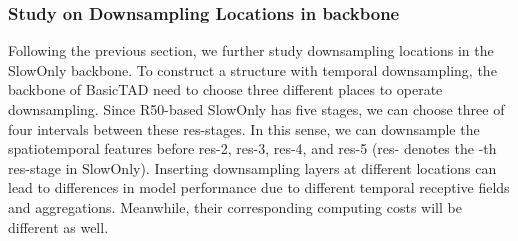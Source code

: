\documentclass[a4paper,fleqn]{cas-dc}
\begin{document}
\begin{table*}[t]
\centering
\small
\caption{\textbf{Comparison between three kinds of the neck on THUMOS14~\citep{THUMOS14}}. We test three different kinds of neck and compare the results on THUMOS14. We denote the down-sampling operator of Lateral-TFPN as ``-'' because it uses the multi-scale feature from the backbone.}
\label{table:neck_operator}
\setlength\tabcolsep{3.3mm}
\end{table*}




\noindent
\subsubsection{Study on Downsampling Locations in backbone}
Following the previous section, we further study downsampling locations in the SlowOnly backbone.
To construct a structure with  temporal downsampling, the backbone of BasicTAD need to choose three different places to operate  downsampling.
Since R50-based SlowOnly has five stages, we can choose three of four intervals between these res-stages. In this sense, we can downsample the spatiotemporal features before res-2, res-3, res-4, and res-5 (res- denotes the -th res-stage in SlowOnly). Inserting downsampling layers at different locations can lead to differences in model performance due to different temporal receptive fields and aggregations. Meanwhile, their corresponding computing costs will be different as well.
\end{document}
